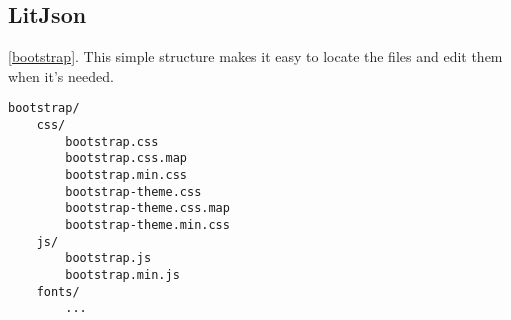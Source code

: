 \subsection {LitJson}
 \autoref{bootstrap}. This simple structure makes it easy to locate the files and edit them when it's needed.
\begin{lstlisting}[caption={Bootstrap folder structure},label={bootstrap}]
bootstrap/
    css/
        bootstrap.css
        bootstrap.css.map
        bootstrap.min.css
        bootstrap-theme.css
        bootstrap-theme.css.map
        bootstrap-theme.min.css
    js/
        bootstrap.js
        bootstrap.min.js
    fonts/
        ...
\end{lstlisting}
\clearpage